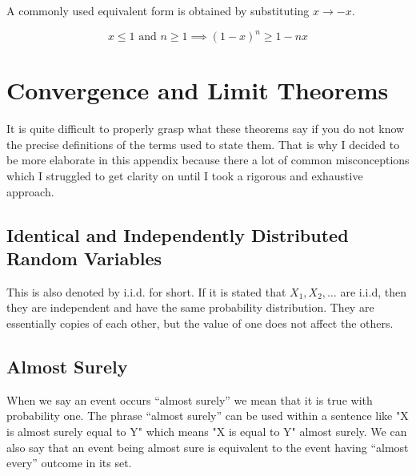 A commonly used equivalent form is obtained by substituting \(x \to -x\).

\[
x \le 1 \text{ and } n\ge 1 \implies (1-x)^n\ge 1-nx
\]

\begin{center}
\end{center}


\chapter{Convergence and Limit Theorems}
It is quite difficult to properly grasp what these theorems say if you do not know the 
precise definitions of the terms used to state them. That is why I decided to be more 
elaborate in this appendix because there a lot of common misconceptions which I struggled 
to get clarity on until I took a rigorous and exhaustive approach.


\section{Identical and Independently Distributed Random Variables}
This is also denoted by i.i.d. for short. If it is stated that $X_1,X_2,\ldots$ are i.i.d, then 
they are independent and have the same probability distribution. They are essentially copies of each other, 
but the value of one does not affect the others. 

\section{Almost Surely}
When we say an event occurs ``almost surely'' we mean that it is true with probability one. The phrase 
``almost surely'' can be used within a sentence like "X is almost surely equal to Y" which means 
"X is equal to Y" almost surely. We can also say that an event being almost sure is equivalent to the 
event having ``almost every'' outcome in its set.\\


